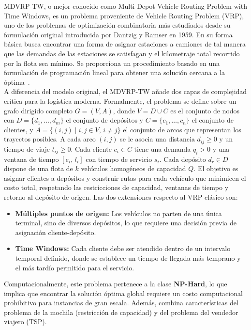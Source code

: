 \documentclass[letter, 10pt]{article}
\begin{document}
MDVRP-TW, o mejor conocido como Multi-Depot Vehicle Routing Problem with Time Windows, es un problema proveniente de Vehicle Routing Problem (VRP), uno de los problemas de optimizaci\'on combinatoria m\'as estudiados desde su formulaci\'on original introducida por Dantzig y Ramser en 1959. En su forma b\'asica busca encontrar una forma de asignar estaciones a camiones de tal manera que las demandas de las estaciones se satisfagan y el kilometraje total recorrido por la flota sea m\'inimo. Se proporciona un procedimiento basado en una formulaci\'on de programaci\'on lineal para obtener una soluci\'on cercana a la \'optima~\cite{1959truck}.\\

A diferencia del modelo original, el MDVRP-TW a\~nade dos capas de complejidad cr\'itica para la log\'istica moderna. Formalmente, el problema se define sobre un grafo dirigido completo $G = (V, A)$, donde $V = D \cup C$ es el conjunto de nodos con $D = \{d_1, \dots, d_m\}$ el conjunto de dep\'ositos y $C = \{c_1, \dots, c_n\}$ el conjunto de clientes, y $A = \{(i,j) \mid i,j \in V,\, i \neq j\}$ el conjunto de arcos que representan los trayectos posibles. A cada arco $(i,j)$ se le asocia una distancia $d_{ij} \geq 0$ y un tiempo de viaje $t_{ij} \geq 0$. Cada cliente $c_i \in C$ tiene una demanda $q_i > 0$ y una ventana de tiempo $[e_i,\, l_i]$ con tiempo de servicio $s_i$. Cada dep\'osito $d_r \in D$ dispone de una flota de $k$ veh\'iculos homog\'eneos de capacidad $Q$. El objetivo es asignar clientes a dep\'ositos y construir rutas para cada veh\'iculo que minimicen el costo total, respetando las restricciones de capacidad, ventanas de tiempo y retorno al dep\'osito de origen. Las dos extensiones respecto al VRP cl\'asico son:

\begin{itemize}
\item \textbf{M\'ultiples puntos de origen:} Los veh\'iculos no parten de una \'unica terminal, sino de diversos dep\'ositos, lo que requiere una decisi\'on previa de asignaci\'on cliente-dep\'osito.
\item \textbf{Time Windows:} Cada cliente debe ser atendido dentro de un intervalo temporal definido, donde se establece un tiempo de llegada m\'as temprano y el m\'as tard\'io permitido para el servicio.
\end{itemize}

Computacionalmente, este problema pertenece a la clase \textbf{NP-Hard}, lo que implica que encontrar la soluci\'on \'optima global requiere un costo computacional prohibitivo para instancias de gran escala. Adem\'as, combina caracter\'isticas del problema de la mochila (restricci\'on de capacidad) y del problema del vendedor viajero (TSP).\\
\end{document}
